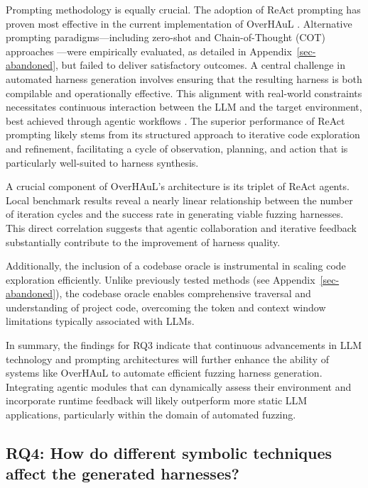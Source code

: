 \documentclass[
  a4paper,
]{scrreprt}
\theoremstyle{definition}
\theoremstyle{remark}
\begin{document}
Prompting methodology is equally crucial. The adoption of ReAct
prompting has proven most effective in the current implementation of
OverHAuL \autocite{reAct}. Alternative prompting paradigms---including
zero-shot and Chain-of-Thought (COT) approaches
\autocite{chainofthought}---were empirically evaluated, as detailed in
Appendix~\ref{sec-abandoned}, but failed to deliver satisfactory
outcomes. A central challenge in automated harness generation involves
ensuring that the resulting harness is both compilable and operationally
effective. This alignment with real-world constraints necessitates
continuous interaction between the LLM and the target environment, best
achieved through agentic workflows \autocite{giannone2025}. The superior
performance of ReAct prompting likely stems from its structured approach
to iterative code exploration and refinement, facilitating a cycle of
observation, planning, and action that is particularly well-suited to
harness synthesis.

A crucial component of OverHAuL's architecture is its triplet of ReAct
agents. Local benchmark results reveal a nearly linear relationship
between the number of iteration cycles and the success rate in
generating viable fuzzing harnesses. This direct correlation suggests
that agentic collaboration and iterative feedback substantially
contribute to the improvement of harness quality.

Additionally, the inclusion of a codebase oracle is instrumental in
scaling code exploration efficiently. Unlike previously tested methods
(see Appendix~\ref{sec-abandoned}), the codebase oracle enables
comprehensive traversal and understanding of project code, overcoming
the token and context window limitations typically associated with LLMs.

In summary, the findings for RQ3 indicate that continuous advancements
in LLM technology and prompting architectures will further enhance the
ability of systems like OverHAuL to automate efficient fuzzing harness
generation. Integrating agentic modules that can dynamically assess
their environment and incorporate runtime feedback will likely
outperform more static LLM applications, particularly within the domain
of automated fuzzing.

\subsection{RQ4: How do different symbolic techniques affect the
generated
harnesses?}\label{rq4-how-do-different-symbolic-techniques-affect-the-generated-harnesses}
\end{document}
